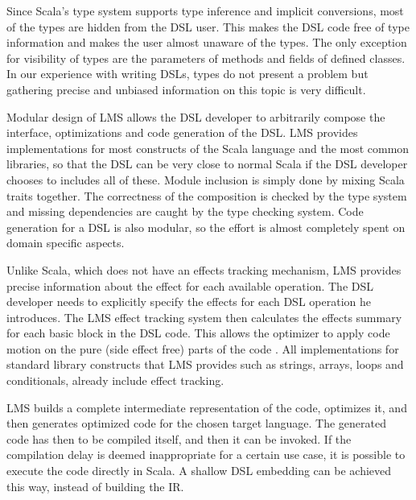 Since Scala's type system supports type inference and implicit conversions, most of the  types are hidden from the DSL user. This makes the DSL code free of type information and makes the user almost unaware of the  types. The only exception for visibility of  types are the parameters of methods and fields of defined classes. In our experience with writing DSLs,  types do not present a problem but gathering precise and unbiased information on this topic is very difficult.  

Modular design of LMS allows the DSL developer to arbitrarily compose the interface, optimizations and code generation of the DSL. LMS provides implementations for most constructs of the Scala language and the most common libraries, so that the DSL can be very close to normal Scala if the DSL developer chooses to includes all of these. Module inclusion is simply done by mixing Scala traits together. The correctness of the composition is checked by the type system and missing dependencies are caught by the type checking system. Code generation for a DSL is also modular, so the effort is almost completely spent on domain specific aspects.

Unlike Scala, which does not have an effects tracking mechanism, LMS provides precise information about the effect for each available operation. The DSL developer needs to explicitly specify the effects for each DSL operation he introduces. The LMS effect tracking system then calculates the effects summary for each basic block in the DSL code. This allows the optimizer to apply code motion on the pure (side effect free) parts of the code . All implementations for standard library constructs that LMS provides such as strings, arrays, loops and conditionals, already include effect tracking.

LMS builds a complete intermediate representation of the code, optimizes it, and then generates optimized code for the chosen target language. The generated code has then to be compiled itself, and then it can be invoked. If the compilation delay is deemed inappropriate for a certain use case, it is possible to execute the code directly in Scala. A shallow DSL embedding can be achieved this way, instead of building the IR.
 
